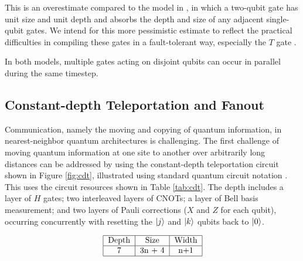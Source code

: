 \documentclass[twoside]{article}
\begin{document}
This is
an overestimate compared to the model in \cite{Kutin2006}, in which a
two-qubit gate has unit size and unit depth and
absorbs the depth and size of any adjacent single-qubit gates. We intend
for this more pessimistic estimate to reflect the practical difficulties
in compiling these gates in a fault-tolerant way, especially the $T$ gate
\cite{}.

In both models, multiple gates acting on disjoint qubits
can occur in parallel during the same timestep.

\subsection{Constant-depth Teleportation and Fanout}
\label{subsec:fanout}

Communication, namely the moving and copying of quantum information, in nearest-neighbor quantum architectures is challenging.
The first challenge of moving quantum information at one site to another over
arbitrarily long distances can be addressed by using
the constant-depth teleportation circuit
shown in Figure \ref{fig:cdt}, illustrated using standard quantum circuit
notation \cite{Nielsen2000}. This uses the circuit resources shown in
Table \ref{tab:cdt}. The depth includes a layer of $H$ gates; two interleaved
layers of CNOTs; a layer of Bell basis measurement; and two layers of
Pauli corrections ($X$ and $Z$ for each qubit), occurring concurrently with
resetting the $\left\vert{j}\right\rangle$ and $\left\vert{k}\right\rangle$ qubits back to $\left\vert{0}\right\rangle$.

\begin{table}
\begin{center}
\begin{displaymath}
\begin{tabular}{|c|c|c|c|}
\hline
\text{Depth} & \text{Size} & \text{Width}\\
\hline
7 & 3n + 4 & n+1\\
\hline
\end{tabular}
\end{displaymath}
\centerline{}
\label{tab:cdt}
\end{center}
\end{table}
\end{document}

